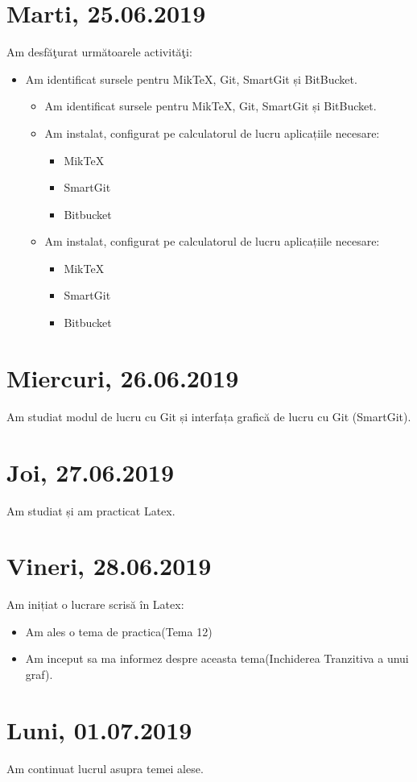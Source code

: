 \documentclass{report}
\begin{document}
\chapter {Marti, 25.06.2019}
Am desfăţurat următoarele activităţi:
\begin{itemize}
\item
Am identificat sursele pentru MikTeX, Git, SmartGit și BitBucket.
\begin{itemize}
\item
Am identificat sursele pentru MikTeX, Git, SmartGit și BitBucket.
\item
Am instalat, configurat pe calculatorul de lucru aplicațiile necesare:
\begin{itemize}
\item
MikTeX
\item
SmartGit
\item
Bitbucket
\end{itemize}
\item
Am instalat, configurat pe calculatorul de lucru aplicațiile necesare:
\begin{itemize}
\item
MikTeX
\item
SmartGit
\item
Bitbucket
\end{itemize}

\end{itemize}
\end{itemize}

\chapter{Miercuri, 26.06.2019}
Am studiat modul de lucru cu Git și interfața grafică de lucru cu Git (SmartGit).
\chapter{Joi, 27.06.2019}
Am studiat și am practicat Latex.
\chapter{Vineri, 28.06.2019}
Am inițiat o lucrare scrisă în Latex:
\begin{itemize}
\item
Am ales o tema de practica(Tema 12)
\item
Am inceput sa ma informez despre aceasta tema(Inchiderea Tranzitiva a unui graf).
\end{itemize}
\chapter{Luni, 01.07.2019}
Am continuat lucrul asupra temei alese.
\end{document}
